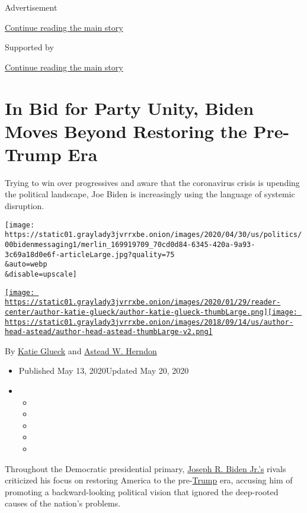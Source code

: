 Advertisement

\protect\hyperlink{after-top}{Continue reading the main story}

Supported by

\protect\hyperlink{after-sponsor}{Continue reading the main story}

\hypertarget{in-bid-for-party-unity-biden-moves-beyond-restoring-the-pre-trump-era}{%
\section{In Bid for Party Unity, Biden Moves Beyond Restoring the
Pre-Trump
Era}\label{in-bid-for-party-unity-biden-moves-beyond-restoring-the-pre-trump-era}}

Trying to win over progressives and aware that the coronavirus crisis is
upending the political landscape, Joe Biden is increasingly using the
language of systemic disruption.

\texttt{[image: https://static01.graylady3jvrrxbe.onion/images/2020/04/30/us/politics/00bidenmessaging1/merlin\_169919709\_70cd0d84-6345-420a-9a93-3c69a18d0e6f-articleLarge.jpg?quality=75\\\&auto=webp\\\&disable=upscale]}

\href{https://www.nytimes3xbfgragh.onion/by/katie-glueck}{\texttt{[image: https://static01.graylady3jvrrxbe.onion/images/2020/01/29/reader-center/author-katie-glueck/author-katie-glueck-thumbLarge.png]}}\href{https://www.nytimes3xbfgragh.onion/by/astead-w-herndon}{\texttt{[image: https://static01.graylady3jvrrxbe.onion/images/2018/09/14/us/author-head-astead/author-head-astead-thumbLarge-v2.png]}}

By \href{https://www.nytimes3xbfgragh.onion/by/katie-glueck}{Katie
Glueck} and
\href{https://www.nytimes3xbfgragh.onion/by/astead-w-herndon}{Astead W.
Herndon}

\begin{itemize}
\item
  Published May 13, 2020Updated May 20, 2020
\item
  \begin{itemize}
  \item
  \item
  \item
  \item
  \item
  \end{itemize}
\end{itemize}

Throughout the Democratic presidential primary,
\href{https://www.nytimes3xbfgragh.onion/2020/05/20/us/politics/trump-biden-subpoena.html}{Joseph
R. Biden Jr.'s} rivals criticized his focus on restoring America to the
pre-\href{https://www.nytimes3xbfgragh.onion/2020/05/20/us/politics/trump-biden-subpoena.html}{Trump}
era, accusing him of promoting a backward-looking political vision that
ignored the deep-rooted causes of the nation's problems.

